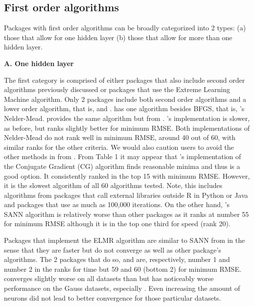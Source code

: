 \hypertarget{first-order-algorithms}{%
\subsection{First order algorithms}\label{first-order-algorithms}}

Packages with first order algorithms can be broadly categorized into 2
types: (a) those that allow for one hidden layer (b) those that allow
for more than one hidden layer.

\textbf{A. One hidden layer}

The first category is comprised of either packages that also include
second order algorithms previously discussed or packages that use the
Extreme Learning Machine algorithm. Only 2 packages include both second
order algorithms and a lower order algorithm, that is, 
and .  has one algorithm besides BFGS,
that is, 's Nelder-Mead.  provides the
same algorithm but from . 's
implementation is slower, as before, but ranks slightly better for
minimum RMSE. Both implementations of Nelder-Mead do not rank well in
minimum RMSE, around 40 out of 60, with similar ranks for the other
criteria. We would also caution users to avoid the other methods in
 from . From Table 1 it may appear that
's implementation of the Conjugate Gradient (CG)
algorithm finds reasonable minima and thus is a good option. It
consistently ranked in the top 15 with minimum RMSE. However, it is the
slowest algorithm of all 60 algorithms tested. Note, this includes
algorithms from packages that call external libraries outside \textsf{R}
in \textsf{Python} or \textsf{Java} and packages that use as much as
100,000 iterations. On the other hand, 's SANN
algorithm is relatively worse than other packages as it ranks at number
55 for minimum RMSE although it is in the top one third for speed (rank
20).

Packages that implement the ELMR algorithm are similar to SANN from
 in the sense that they are faster but do not converge
as well as other package's algorithms. The 2 packages that do so,
 \citep{R-elmNNRcpp} and 
\citep{R-ELMR} are, respectively, number 1 and number 2 in the ranks for
time but 59 and 60 (bottom 2) for minimum RMSE.  converges
slightly worse on all datasets than  but has
noticeably worse performance on the Gauss datasets, especially
. Even increasing the amount of neurons did not lead to
better convergence for those particular datasets.

